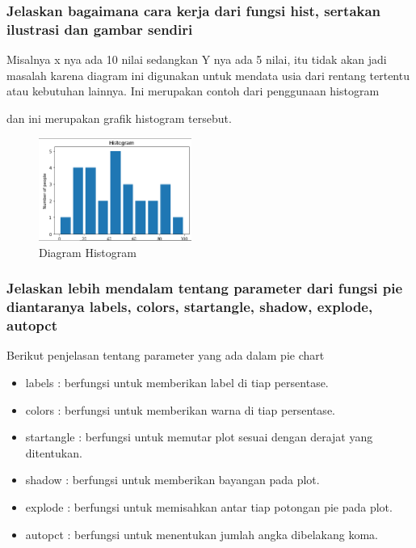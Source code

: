 \subsubsection{Jelaskan bagaimana cara kerja dari fungsi hist, sertakan ilustrasi dan gambar sendiri}
\hfill \break
Misalnya x nya ada 10 nilai sedangkan Y nya ada 5 nilai, itu tidak akan jadi masalah karena diagram ini digunakan untuk mendata usia dari rentang tertentu atau kebutuhan lainnya.
Ini merupakan contoh dari penggunaan histogram

dan ini merupakan grafik histogram tersebut.
\begin{figure}[H]	
    \includegraphics[width=5cm]{figures/6/1154016/teori/histogram.png}
    \centering
    \caption{Diagram Histogram}
\end{figure}
\subsubsection{Jelaskan lebih mendalam tentang parameter dari fungsi pie diantaranya labels, colors, startangle, shadow, explode, autopct}
\hfill \break
Berikut penjelasan tentang parameter yang ada dalam pie chart
 \begin{itemize}
 	\item labels : berfungsi untuk memberikan label di tiap persentase.
 	\item colors : berfungsi untuk memberikan warna di tiap persentase.
 	\item startangle : berfungsi untuk memutar plot sesuai dengan derajat yang ditentukan.
 	\item shadow : berfungsi untuk memberikan bayangan pada plot.
 	\item explode : berfungsi untuk memisahkan antar tiap potongan pie pada plot.
 	\item autopct : berfungsi untuk menentukan jumlah angka dibelakang koma.
 \end{itemize}
